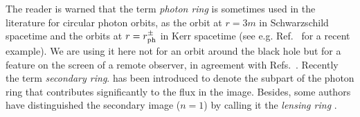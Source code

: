 \begin{remark}
The reader is warned that the term \emph{photon ring} is sometimes used in
the literature for circular photon orbits, as the orbit at $r=3m$ in Schwarzschild spacetime
and the orbits at $r=r_{\rm ph}^\pm$ in Kerr spacetime (see e.g. Ref.~\cite{CardoDF21} for
a recent example). We are using it here
not for an orbit around the black hole but for a feature on the screen of a remote observer,
in agreement with Refs.~\cite{BeckwD05,JohanP10,Johns_al20,GrallL20a,GrallL20c}.
Recently the term \emph{secondary ring}. has been introduced
\cite{VinceWAGLPG21} to denote the subpart of the photon ring that contributes
significantly to the flux in the image.
Besides, some authors have distinguished the secondary image ($n=1$)
by calling it the \emph{lensing ring} \cite{GrallHW19}.
\end{remark}

